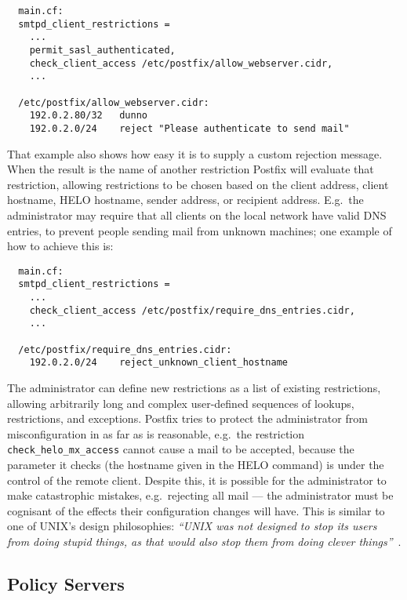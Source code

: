 \begin{verbatim}
  main.cf:
  smtpd_client_restrictions =
    ...
    permit_sasl_authenticated,
    check_client_access /etc/postfix/allow_webserver.cidr,
    ...

  /etc/postfix/allow_webserver.cidr:
    192.0.2.80/32   dunno
    192.0.2.0/24    reject "Please authenticate to send mail"
\end{verbatim}

That example also shows how easy it is to supply a custom rejection
message.  When the result is the name of another restriction Postfix will
evaluate that restriction, allowing restrictions to be chosen based on the
client  address, client hostname, HELO hostname, sender
address, or recipient address.  E.g.\ the administrator may require that
all clients on the local network have valid DNS entries, to prevent people
sending mail from unknown machines; one example of how to achieve this is:

\begin{verbatim}
  main.cf:
  smtpd_client_restrictions =
    ...
    check_client_access /etc/postfix/require_dns_entries.cidr,
    ...

  /etc/postfix/require_dns_entries.cidr:
    192.0.2.0/24    reject_unknown_client_hostname
\end{verbatim}

The administrator can define new restrictions as a list of existing
restrictions, allowing arbitrarily long and complex user-defined sequences
of lookups, restrictions, and exceptions.  Postfix tries to protect the
administrator from misconfiguration in as far as is reasonable, e.g.\ the
restriction \texttt{check\_helo\_mx\_access} cannot cause a mail to be
accepted, because the parameter it checks (the hostname given in the HELO
command) is under the control of the remote client.  Despite this, it is
possible for the administrator to make catastrophic mistakes, e.g.\
rejecting all mail --- the administrator must be cognisant of the effects
their configuration changes will have.  This is similar to one of UNIX's
design philosophies: \textit{``UNIX was not designed to stop its users from
doing stupid things, as that would also stop them from doing clever
things''\/}~\cite{unix-philosophy}.

\subsection{Policy Servers}

\label{policy servers}

